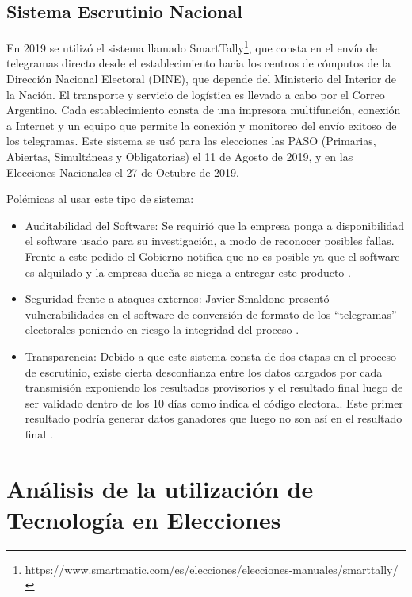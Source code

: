 \subsection{Sistema Escrutinio Nacional}
En 2019 se utilizó el sistema llamado SmartTally\footnote{https://www.smartmatic.com/es/elecciones/elecciones-manuales/smarttally/}, que consta en el envío de telegramas directo desde el establecimiento hacia los centros de cómputos de la Dirección Nacional Electoral (DINE), que depende del Ministerio del Interior de la Nación. El transporte y servicio de logística es llevado a cabo por el Correo Argentino. Cada establecimiento consta de una impresora multifunción, conexión a Internet y un equipo que permite la conexión y monitoreo del envío exitoso de los telegramas. \newline
Este sistema se usó para las elecciones las PASO (Primarias, Abiertas, Simultáneas y Obligatorias) el 11 de Agosto de 2019, y en las Elecciones Nacionales el 27 de Octubre de 2019.

Polémicas al usar este tipo de sistema:
\begin{itemize}
    \item Auditabilidad del Software: Se requirió que la empresa ponga a disponibilidad el software usado para su investigación, a modo de reconocer posibles fallas. Frente a este pedido el Gobierno notifica que no es posible ya que el software es alquilado y la empresa dueña se niega a entregar este producto \cite{auditabilidadSmartmatic}.
    \item Seguridad frente a ataques externos: Javier Smaldone presentó vulnerabilidades en el software de conversión de formato de los ``telegramas'' electorales poniendo en riesgo la integridad del proceso \cite{seguridadSmartmatic}.
    \item Transparencia: Debido a que este sistema consta de dos etapas en el proceso de escrutinio, existe cierta desconfianza entre los datos cargados por cada transmisión exponiendo los resultados provisorios y el resultado final luego de ser validado dentro de los 10 días como indica el código electoral. Este primer resultado podría generar datos ganadores que luego no son así en el resultado final \cite{rnEscrutinioProvisorio}.
\end{itemize}



\section{Análisis de la utilización de Tecnología en Elecciones}

